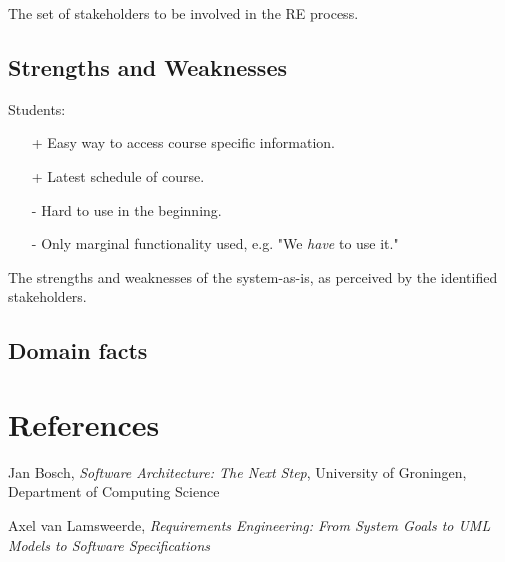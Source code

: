 The set of stakeholders to be involved in the RE process.

\section{Strengths and Weaknesses}
Students:
\begin{itemize}
	\item[+] Easy way to access course specific information.
	\item[+] Latest schedule of course.
	\item[-] Hard to use in the beginning.
	\item[-] Only marginal functionality used, e.g. "We \textit{have} to use it."
\end{itemize}



The strengths and weaknesses of the system-as-is, as perceived by the identified stakeholders.

\section{Domain facts}


\chapter{References}

\begin{thebibliography}{9}
	
	Jan Bosch,
	\emph{Software Architecture: The Next Step},
	University of Groningen, Department of Computing Science
	
	Axel van Lamsweerde,
	\emph{Requirements Engineering: From System Goals to UML Models to Software Specifications}
	
	
\end{thebibliography}


\appendix



